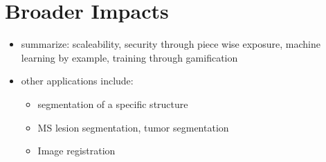 \section{Broader Impacts}

\begin{itemize}
\item summarize: scaleability, security through piece wise exposure, machine learning by example, training through gamification
\item other applications include:
\begin{itemize}
\item segmentation of a specific structure
\item MS lesion segmentation, tumor segmentation
\item Image registration
\end{itemize}
\end{itemize}